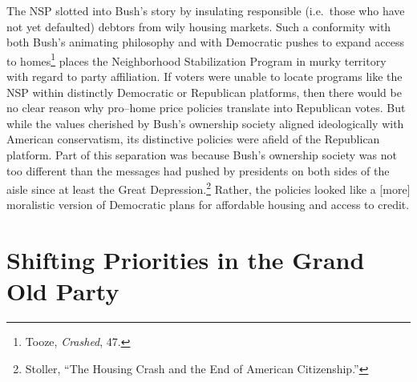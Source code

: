 \documentclass[12pt,oneside]{psthesis}
\begin{document}
The NSP slotted into Bush's story by insulating responsible (i.e.~those who have not yet defaulted) debtors from wily housing markets.
Such a conformity with both Bush's animating philosophy and with Democratic pushes to expand access to homes\footnote{Tooze, \emph{Crashed}, 47.} places the Neighborhood Stabilization Program in murky territory with regard to party affiliation.
If voters were unable to locate programs like the NSP within distinctly Democratic or Republican platforms, then there would be no clear reason why pro--home price policies translate into Republican votes.
But while the values cherished by Bush's ownership society aligned ideologically with American conservatism, its distinctive policies were afield of the Republican platform.
Part of this separation was because Bush's ownership society was not too different than the messages had pushed by presidents on both sides of the aisle since at least the Great Depression.\footnote{Stoller, ``The Housing Crash and the End of American Citizenship.''}
Rather, the policies looked like a {[}more{]} moralistic version of Democratic plans for affordable housing and access to credit.

\hypertarget{shifting-priorities-in-the-grand-old-party}{%
\section{Shifting Priorities in the Grand Old Party}\label{shifting-priorities-in-the-grand-old-party}}
\end{document}

